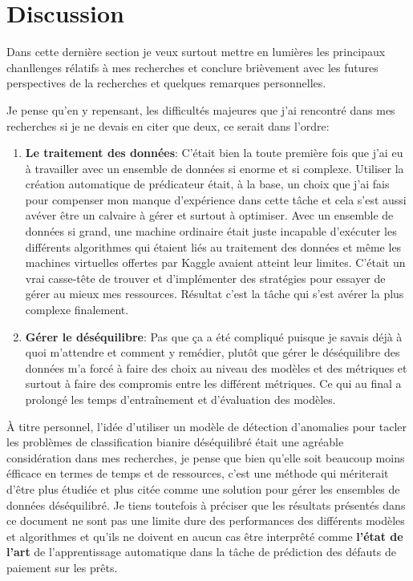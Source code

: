 \section{Discussion}
\label{chapter6.section2}
Dans cette dernière section je veux surtout mettre en lumières les principaux chanllenges rélatifs à mes recherches et conclure brièvement avec les futures perspectives de la recherches et quelques remarques personnelles.

Je pense qu'en y repensant, les difficultés majeures que j'ai rencontré dans mes recherches si je ne devais en citer que deux, ce serait dans l'ordre:

\begin{enumerate}
    \item \textbf{Le traitement des données}: C'était bien la toute première fois que j'ai eu à travailler avec un ensemble de données si enorme et si complexe. Utiliser la création automatique de prédicateur était, à la base, un choix que j'ai fais pour compenser mon manque d'expérience dans cette tâche et cela s'est aussi avéver être un calvaire à gérer et surtout à optimiser. Avec un ensemble de données si grand, une machine ordinaire était juste incapable d'exécuter les différents algorithmes qui étaient liés au traitement des données et même les machines virtuelles offertes par Kaggle avaient atteint leur limites. C'était un vrai casse-tête de trouver et d'implémenter des stratégies pour essayer de gérer au mieux mes ressources. Résultat c'est la tâche qui s'est avérer la plus complexe finalement.
    \item \textbf{Gérer le déséquilibre}: Pas que ça a été compliqué puisque je savais déjà à quoi m'attendre et comment y remédier, plutôt que gérer le déséquilibre des données m'a forcé à faire des choix au niveau des modèles et des métriques et surtout à faire des compromis entre les différent métriques. Ce qui au final a prolongé les temps d'entraînement et d'évaluation des modèles.
\end{enumerate}

À titre personnel, l'idée d'utiliser un modèle de détection d'anomalies pour tacler les problèmes de classification bianire déséquilibré était une agréable considération dans mes recherches, je pense que bien qu'elle soit beaucoup moins éfficace en termes de temps et de ressources, c'est une méthode qui mériterait d'être plus étudiée et plus citée comme une solution pour gérer les ensembles de données déséquilibré. Je tiens toutefois à préciser que les résultats présentés dans ce document ne sont pas une limite dure des performances des différents modèles et algorithmes et qu'ils ne doivent en aucun cas être interprêté comme \textbf{l'état de l'art} de l'apprentissage automatique dans la tâche de prédiction des défauts de paiement sur les prêts.

